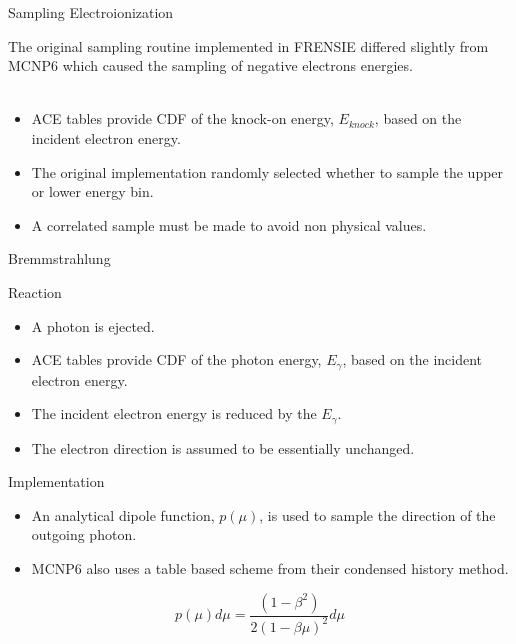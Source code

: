 \documentclass{beamer}
\begin{document}
\begin{frame}{Sampling Electroionization}
  
{\large The original sampling routine implemented in FRENSIE differed slightly from MCNP6 which caused the sampling of negative electrons energies. } \\ 
~~\\

  \begin{itemize}
    \item ACE tables provide CDF of the knock-on energy, $E_{knock}$, based on the incident electron energy.
    \item The original implementation randomly selected whether to sample the upper or lower energy bin.
    \item A correlated sample must be made to avoid non physical values.
  \end{itemize}

\end{frame}


\begin{frame}{Bremmstrahlung}
  \begin{block}{Reaction}
  \begin{itemize}
    \item A photon is ejected.
    \item ACE tables provide CDF of the photon energy, $E_{\gamma}$, based on the incident electron energy.
    \item The incident electron energy is reduced by the $E_{\gamma}$.
    \item The electron direction is assumed to be essentially unchanged.
      \end{itemize}
  \end{block}  
      
  \begin{block}{Implementation}
    \begin{itemize}
    \item An analytical dipole function, $p(\mu)$, is used to sample the direction of the outgoing photon.
    \item MCNP6 also uses a table based scheme from their condensed history method.
  \end{itemize}
  \begin{equation*}
    p(\mu)d\mu = \frac{(1-\beta^2)}{2(1-\beta\mu)^2}d\mu
  \end{equation*}
  \end{block}  

\end{frame}
\end{document}
